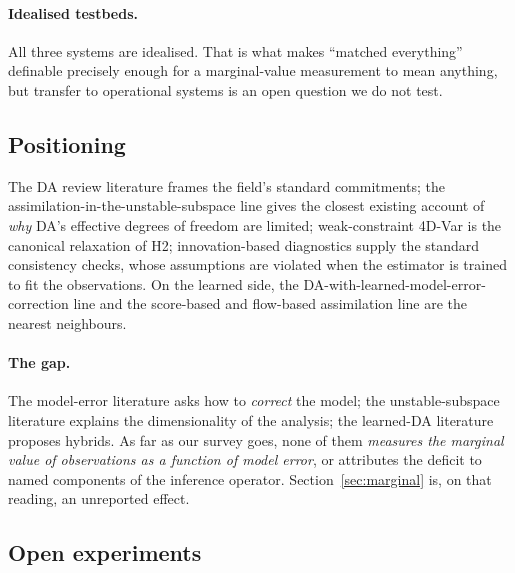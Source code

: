 \paragraph{Idealised testbeds.}
All three systems are idealised. That is what makes ``matched everything''
definable precisely enough for a marginal-value measurement to mean anything,
but transfer to operational systems is an open question we do not test.

\subsection{Positioning}
\label{sec:positioning}


The DA review literature frames the field's standard commitments; the
assimilation-in-the-unstable-subspace line gives the closest existing account of
\emph{why} DA's effective degrees of freedom are limited; weak-constraint 4D-Var
is the canonical relaxation of H2; innovation-based diagnostics supply the
standard consistency checks, whose assumptions are violated when the estimator is
trained to fit the observations. On the learned side, the
DA-with-learned-model-error-correction line and the score-based and flow-based
assimilation line are the nearest neighbours.

\paragraph{The gap.}
The model-error literature asks how to \emph{correct} the model; the
unstable-subspace literature explains the dimensionality of the analysis; the
learned-DA literature proposes hybrids. As far as our survey goes, none of them
\emph{measures the marginal value of observations as a function of model error},
or attributes the deficit to named components of the inference operator.
Section~\ref{sec:marginal} is, on that reading, an unreported effect.

\subsection{Open experiments}
\label{sec:open}


